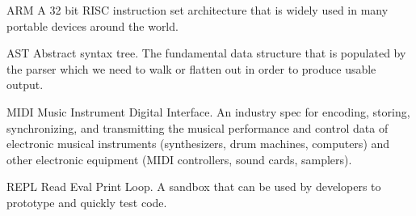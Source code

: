 \documentclass{article}
\begin{document}
\begin{description}

\item{ARM} A 32 bit RISC instruction set architecture that is widely used in many portable devices around the world.


\item{AST} Abstract syntax tree. The fundamental data structure that is populated by the parser which we need to walk or flatten out in order to produce usable output.


\item{MIDI} Music Instrument Digital Interface. An industry spec for encoding, storing, synchronizing, and transmitting the musical performance and control data of electronic musical instruments (synthesizers, drum machines, computers) and other electronic equipment (MIDI controllers, sound cards, samplers).


\item{REPL} Read Eval Print Loop. A sandbox that can be used by developers to prototype and quickly test code.

\end{description}
\end{document}
